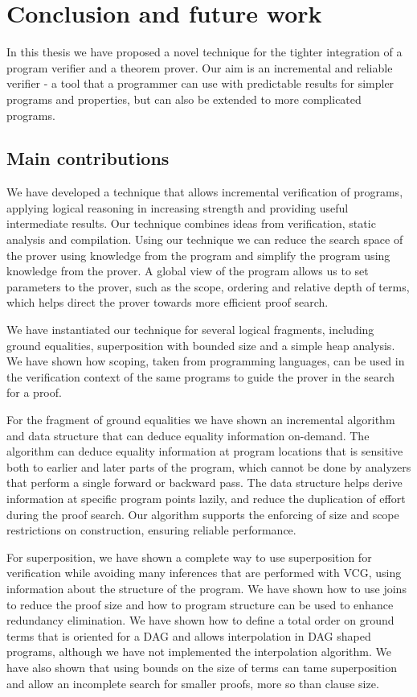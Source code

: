 \newpage
\chapter{Conclusion and future work}\label{chapter:conclusions}

In this thesis we have proposed a novel technique for the tighter integration of a program verifier and a theorem prover.
Our aim is an incremental and reliable verifier - a tool that a programmer can use with predictable results for simpler programs and properties, but can also be extended to more complicated programs.

\section{Main contributions}
We have developed a technique that allows incremental verification of programs, applying logical reasoning in increasing strength and providing useful intermediate results. Our technique combines ideas from verification, static analysis and compilation.
Using our technique we can reduce the search space of the prover using knowledge from the program and simplify the program using knowledge from the prover. A global view of the program allows us to set parameters to the prover, such as the scope, ordering and relative depth of terms, which helps direct the prover towards more efficient proof search.

We have instantiated our technique for several logical fragments, including ground equalities, superposition with bounded size and a simple heap analysis. 
We have shown how scoping, taken from programming languages, can be used in the verification context of the same programs to guide the prover in the search for a proof.

For the fragment of ground equalities we have shown an incremental algorithm and data structure that can deduce equality information on-demand. The algorithm can deduce equality information at program locations that is sensitive both to earlier and later parts of the program, which cannot be done by analyzers that perform a single forward or backward pass. The data structure helps derive information at specific program points lazily, and reduce the duplication of effort during the proof search. Our algorithm supports the enforcing of size and scope restrictions on construction, ensuring reliable performance.

For superposition, we have shown a complete way to use superposition for verification while avoiding many inferences that are performed with VCG, using information about the structure of the program. We have shown how to use joins to reduce the proof size and how to program structure can be used to enhance redundancy elimination. We have shown how to define a total order on ground terms that is oriented for a DAG and allows interpolation in DAG shaped programs, although we have not implemented the interpolation algorithm.
We have also shown that using bounds on the size of terms can tame superposition and allow an incomplete search for smaller proofs, more so than clause size.

